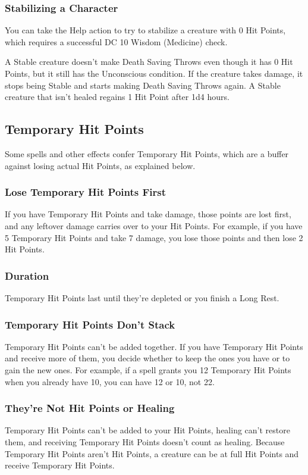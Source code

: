 \documentclass[10pt,a4paper,twoside,bg=print,twocolumn,openany,nodeprecatedcode]{dndbook}
\begin{document}
\subsubsection{Stabilizing a Character}
You can take the Help action to try to stabilize a creature with 0 Hit Points, which requires a successful DC 10 Wisdom (Medicine) check.

A Stable creature doesn't make Death Saving Throws even though it has 0 Hit Points, but it still has the Unconscious condition. If the creature takes damage, it stops being Stable and starts making Death Saving Throws again. A Stable creature that isn't healed regains 1 Hit Point after 1d4 hours.

\subsection{Temporary Hit Points}
Some spells and other effects confer Temporary Hit Points, which are a buffer against losing actual Hit Points, as explained below.

\subsubsection{Lose Temporary Hit Points First}
If you have Temporary Hit Points and take damage, those points are lost first, and any leftover damage carries over to your Hit Points. For example, if you have 5 Temporary Hit Points and take 7 damage, you lose those points and then lose 2 Hit Points.

\subsubsection{Duration}
Temporary Hit Points last until they're depleted or you finish a Long Rest.

\subsubsection{Temporary Hit Points Don't Stack}
Temporary Hit Points can't be added together. If you have Temporary Hit Points and receive more of them, you decide whether to keep the ones you have or to gain the new ones. For example, if a spell grants you 12 Temporary Hit Points when you already have 10, you can have 12 or 10, not 22.

\subsubsection{They're Not Hit Points or Healing}
Temporary Hit Points can't be added to your Hit Points, healing can't restore them, and receiving Temporary Hit Points doesn't count as healing. Because Temporary Hit Points aren't Hit Points, a creature can be at full Hit Points and receive Temporary Hit Points.
\end{document}
